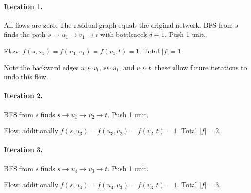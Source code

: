 \documentclass[11pt]{article}
\begin{document}
\paragraph{Iteration 1.}
All flows are zero.  The residual graph equals the original
network.  BFS from $s$ finds the path
$s \to u_1 \to v_1 \to t$ with bottleneck
$\delta = 1$.  Push 1 unit.

Flow: $f(s,u_1) = f(u_1,v_1) = f(v_1,t) = 1$.  Total $|f| = 1$.

\begin{center}
\end{center}

Note the backward edges $u_1 \dashleftarrow v_1$,
$s \dashleftarrow u_1$, and $v_1 \dashleftarrow t$: these allow
future iterations to undo this flow.

\paragraph{Iteration 2.}
BFS from $s$ finds $s \to u_3 \to v_2 \to t$.  Push 1 unit.

Flow: additionally $f(s,u_3) = f(u_3,v_2) = f(v_2,t) = 1$.
Total $|f| = 2$.

\paragraph{Iteration 3.}
BFS from $s$ finds $s \to u_4 \to v_3 \to t$.  Push 1 unit.

Flow: additionally $f(s,u_4) = f(u_4,v_3) = f(v_3,t) = 1$.
Total $|f| = 3$.
\end{document}
